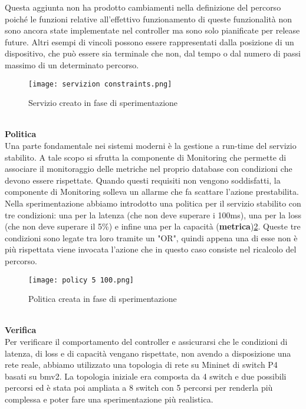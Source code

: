 Questa aggiunta non ha prodotto cambiamenti nella definizione del percorso poiché le funzioni relative all'effettivo funzionamento di queste funzionalità non 
sono ancora state implementate nel controller ma sono solo pianificate per release future.
Altri esempi di vincoli possono essere rappresentati dalla posizione di un dispositivo, che può essere sia terminale che non, dal tempo o dal numero di passi massimo di un determinato percorso.
\begin{figure}[h]
    \centering
   \texttt{[image: servizion constraints.png]}
    \caption{Servizio creato in fase di sperimentazione}
    \label{fig:constraints}
\end{figure}
\\\textbf{Politica}
\\Una parte fondamentale nei sistemi moderni è la gestione a run-time del servizio stabilito\cite{demo}.
A tale scopo si sfrutta la componente di Monitoring che permette di associare il monitoraggio delle metriche nel proprio database
con condizioni che devono essere rispettate.
Quando questi requisiti non vengono soddisfatti, la componente di Monitoring solleva un allarme che fa scattare l'azione prestabilita.
\\Nella sperimentazione abbiamo introdotto una politica per il servizio stabilito con tre condizioni: una per la latenza (che non deve superare i 100ms), una per la loss (che non deve superare il 5\%) 
e infine una per la capacità (\textbf{metrica})\ref{fig:policy}.
Queste tre condizioni sono legate tra loro tramite un "OR", quindi appena una di esse non è più rispettata viene invocata l'azione che in questo caso consiste nel ricalcolo del percorso.
\begin{figure}[h]
    \centering
   \texttt{[image: policy 5 100.png]}
    \caption{Politica creata in fase di sperimentazione}
    \label{fig:policy}
\end{figure}
\\\textbf{Verifica}
\\Per verificare il comportamento del controller e assicurarsi che le condizioni di latenza, di loss e di capacità vengano rispettate, 
non avendo a disposizione una rete reale, abbiamo utilizzato una topologia di rete su Mininet di switch P4 basati su bmv2\cite{bmv2}.
La topologia iniziale era composta da 4 switch e due possibili percorsi ed è stata poi ampliata a 8 switch con 5 percorsi per renderla più complessa e poter fare una sperimentazione più realistica.

